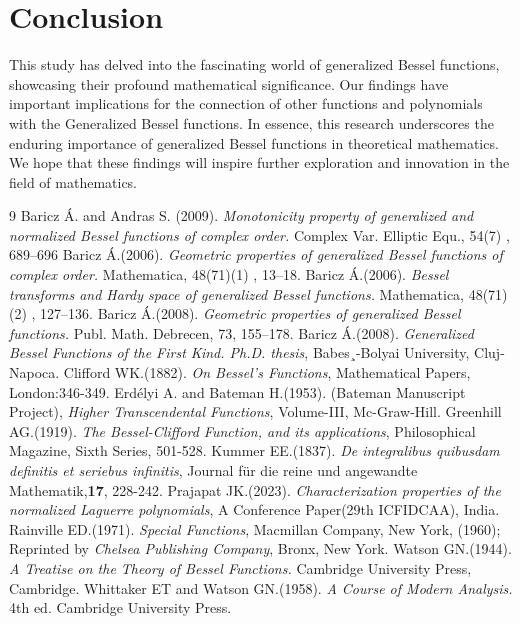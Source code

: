 \documentclass{amsart}
\theoremstyle{definition}
\theoremstyle{remark}
\numberwithin{equation}{section}
\begin{document}
\section{Conclusion}
This study has delved into the fascinating world of generalized Bessel functions, showcasing their profound mathematical significance. Our findings have important implications for the connection of other functions and polynomials with the Generalized Bessel functions. In essence, this research underscores the enduring importance of generalized Bessel functions in theoretical mathematics. We hope that these findings will inspire further exploration and innovation in the field of mathematics.





\begin{thebibliography}{9}
 Baricz \'{A}. and Andras S. (2009). \emph{Monotonicity property of generalized and normalized Bessel functions of complex order.} Complex Var. Elliptic Equ., 54(7) , 689–696
Baricz \'{A}.(2006). \emph{Geometric properties of generalized Bessel functions of complex order.} Mathematica, 48(71)(1) , 13–18.
Baricz \'{A}.(2006). \emph{Bessel transforms and Hardy space of generalized Bessel functions.} Mathematica, 48(71)(2) , 127–136.
Baricz \'{A}.(2008). \emph{Geometric properties of generalized Bessel functions.} Publ. Math. Debrecen, 73, 155–178.
Baricz \'{A}.(2008). \emph{Generalized Bessel Functions of the First Kind. Ph.D. thesis}, Babes¸-Bolyai University, Cluj-Napoca.
Clifford WK.(1882). \emph{On Bessel's Functions}, Mathematical Papers, London:346-349.
Erd\'{e}lyi A. and Bateman H.(1953). (Bateman Manuscript Project), \emph{Higher Transcendental Functions}, Volume-III, Mc-Graw-Hill.
Greenhill AG.(1919). \emph{The Bessel-Clifford Function, and its applications}, Philosophical Magazine, Sixth Series, 501-528.
Kummer EE.(1837). \emph{De integralibus quibusdam definitis et seriebus infinitis}, Journal f\"{u}r die reine und angewandte Mathematik,\textbf{17}, 228-242.
Prajapat JK.(2023). \emph{Characterization properties of the normalized Laguerre polynomials}, A Conference Paper(29th ICFIDCAA), India.
Rainville ED.(1971). \emph{Special Functions}, Macmillan Company, New York, (1960); Reprinted by \emph{Chelsea Publishing Company}, Bronx, New York.
Watson GN.(1944). \emph{A Treatise on the Theory of Bessel Functions.} Cambridge University Press, Cambridge.
Whittaker ET and Watson GN.(1958). \emph{A Course of Modern Analysis.} 4th ed. Cambridge
University Press.


\end{thebibliography}
\end{document}
